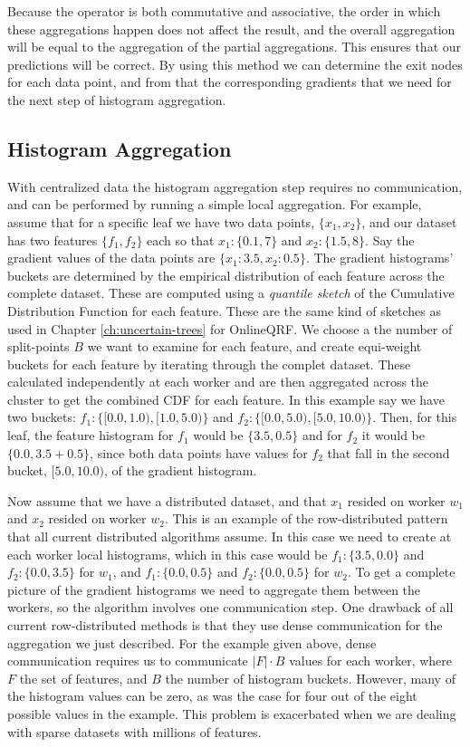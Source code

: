 Because the \AND operator is both commutative and associative, the order in which
these aggregations happen does not affect the result, and the overall aggregation
will be equal to the aggregation of the partial aggregations. This ensures that
our predictions will be correct. By using this method we can determine the exit
nodes for each data point, and from that the corresponding gradients that we need
for the next step of histogram aggregation.

\subsection{Histogram Aggregation}
\label{subsec:block-gbt-histogram-aggregation}


With centralized data the histogram aggregation step requires no communication,
and can be performed by running a simple local aggregation.
For example, assume that for a specific leaf we have two data points, $\{x_1, x_2\}$,
and our dataset has two features $\{f_1, f_2\}$ each so that $x_1: \{0.1, 7\}$ and $x_2: \{1.5, 8\}$.
Say the gradient values of the data points are $\{x_1: 3.5, x_2: 0.5\}$.
The gradient histograms' buckets are determined by the empirical distribution of each
feature across the complete dataset. These are computed using a \emph{quantile sketch}
of the Cumulative Distribution Function for each feature. These are the same kind of sketches
as used in Chapter \ref{ch:uncertain-trees} for OnlineQRF. We choose a the number of split-points
$B$ we want to examine for each feature, and create equi-weight buckets for each feature
by iterating through the complet dataset. These calculated independently at each worker
and are then aggregated across the cluster to get the combined CDF for each feature.
In this example say we have two buckets:
$f_1: \{[0.0, 1.0), [1.0, 5.0)\}$ and $f_2:\{ [0.0, 5.0), [5.0, 10.0)\}$.
Then, for this leaf, the feature histogram for $f_1$ would be $\{3.5, 0.5\}$ and for $f_2$
it would be $\{0.0, 3.5 + 0.5\}$, since both data points have values for $f_2$ that fall
in the second bucket, $[5.0, 10.0)$, of the gradient histogram.

Now assume that we have a distributed dataset, and that $x_1$ resided on worker $w_1$ and $x_2$ resided on worker $w_2$. This is
an example of the row-distributed pattern that all current distributed algorithms assume.
In this case we need to create at each worker local histograms, which
in this case would be $f_1: \{3.5, 0.0\}$ and $f_2: \{0.0, 3.5\}$ for $w_1$, and $f_1: \{0.0, 0.5\}$ and $f_2: \{0.0, 0.5\}$ for $w_2$. To get a complete picture of the gradient histograms
we need to aggregate them between the workers, so the algorithm involves one communication
step. One drawback of all current row-distributed methods is that they use dense communication
for the aggregation we just described. For the example given above, dense communication
requires us to communicate $|F| \cdot B$ values for each worker, where $F$ the set of features,
and $B$ the number of histogram buckets. However,
many of the histogram values can be zero, as was the case for four out of the eight possible
values in the example. This problem is exacerbated when we are dealing with sparse
datasets with millions of features.

